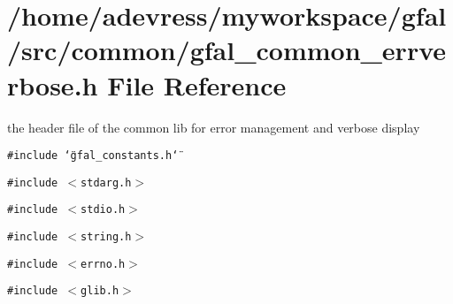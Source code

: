 \section{/home/adevress/myworkspace/gfal/src/common/gfal\_\-common\_\-errverbose.h File Reference}
\label{gfal__common__errverbose_8h}
the header file of the common lib for error management and verbose display 

{\tt \#include \char`\"{}gfal\_\-constants.h\char`\"{}}\par
{\tt \#include $<$stdarg.h$>$}\par
{\tt \#include $<$stdio.h$>$}\par
{\tt \#include $<$string.h$>$}\par
{\tt \#include $<$errno.h$>$}\par
{\tt \#include $<$glib.h$>$}\par
